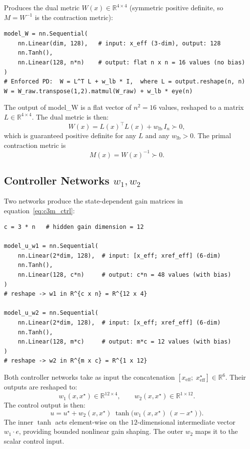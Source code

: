 \documentclass[11pt,a4paper]{article}
\begin{document}
Produces the dual metric \(W(x) \in \mathbb{R}^{4 \times 4}\) (symmetric positive definite, so \(M = W^{-1}\) is the contraction metric):

\begin{lstlisting}[style=python]
model_W = nn.Sequential(
    nn.Linear(dim, 128),   # input: x_eff (3-dim), output: 128
    nn.Tanh(),
    nn.Linear(128, n*n)    # output: flat n x n = 16 values (no bias)
)
# Enforced PD:  W = L^T L + w_lb * I,  where L = output.reshape(n, n)
W = W_raw.transpose(1,2).matmul(W_raw) + w_lb * eye(n)
\end{lstlisting}

\begin{codemath}
The output of model\_W is a flat vector of \(n^2 = 16\) values, reshaped to a matrix \(L \in \mathbb{R}^{4 \times 4}\). The dual metric is then:
\[
W(x) = L(x)^\top L(x) + w_{\mathrm{lb}}\, I_n \succ 0,
\]
which is guaranteed positive definite for any \(L\) and any \(w_{\mathrm{lb}} > 0\).  The primal contraction metric is
\[
M(x) = W(x)^{-1} \succ 0.
\]
\end{codemath}

\subsection{Controller Networks \texorpdfstring{$w_1, w_2$}{w1, w2}}

Two networks produce the state-dependent gain matrices in equation~\eqref{eq:c3m_ctrl}:

\begin{lstlisting}[style=python]
c = 3 * n   # hidden gain dimension = 12

model_u_w1 = nn.Sequential(
    nn.Linear(2*dim, 128),  # input: [x_eff; xref_eff] (6-dim)
    nn.Tanh(),
    nn.Linear(128, c*n)     # output: c*n = 48 values (with bias)
)
# reshape -> w1 in R^{c x n} = R^{12 x 4}

model_u_w2 = nn.Sequential(
    nn.Linear(2*dim, 128),  # input: [x_eff; xref_eff] (6-dim)
    nn.Tanh(),
    nn.Linear(128, m*c)     # output: m*c = 12 values (with bias)
)
# reshape -> w2 in R^{m x c} = R^{1 x 12}
\end{lstlisting}

\begin{codemath}
Both controller networks take as input the concatenation \([x_{\mathrm{eff}};\; x^\star_{\mathrm{eff}}] \in \mathbb{R}^6\). Their outputs are reshaped to:
\[
w_1(x,x^\star) \in \mathbb{R}^{12 \times 4}, \qquad w_2(x,x^\star) \in \mathbb{R}^{1 \times 12}.
\]
The control output is then:
\[
u = u^\star + w_2(x,x^\star)\;\tanh\!\bigl(w_1(x,x^\star)\,(x-x^\star)\bigr).
\]
The inner \(\tanh\) acts element-wise on the \(12\)-dimensional intermediate vector \(w_1 \cdot e\), providing bounded nonlinear gain shaping. The outer \(w_2\) maps it to the scalar control input.
\end{codemath}
\end{document}
